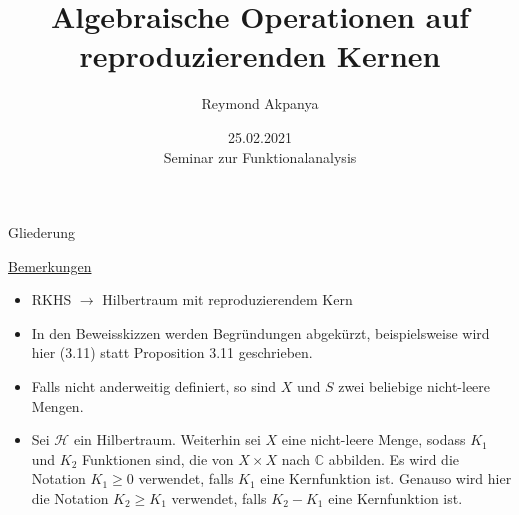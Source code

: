 \documentclass{beamer}
\author{Reymond Akpanya}
\title{Algebraische Operationen auf reproduzierenden Kernen}
\date{25.02.2021 \\[.5\baselineskip] Seminar zur Funktionalanalysis }
\begin{document}
\frame{\maketitle}
\begin{frame}{Gliederung}
\tableofcontents
\end{frame}
\begin{frame}
\underline{Bemerkungen}\\
\begin{itemize}
\item RKHS $\rightarrow$ Hilbertraum mit reproduzierendem Kern \pause 
\item In den Beweisskizzen werden Begründungen abgekürzt, beispielsweise wird hier (3.11) statt Proposition 3.11 geschrieben.\pause
\item Falls nicht anderweitig definiert, so sind $X$ und $S$ zwei beliebige  nicht-leere Mengen.
\end{itemize}
\end{frame}
\begin{frame}
\begin{itemize}
\item Sei $\mathcal{H}$ ein Hilbertraum. Weiterhin sei $X$ eine nicht-leere Menge, sodass $K_1$ und $K_2$ Funktionen sind, die von $X\times X$ nach $\mathbb{C}$ abbilden. 
Es wird die Notation $K_1\geq 0 $ verwendet, falls $K_1$ eine Kernfunktion ist. Genauso wird hier die Notation $K_2\geq K_1$ verwendet, falls $K_2-K_1$ eine Kernfunktion ist. 
\end{itemize}

\end{frame}
\end{document}

